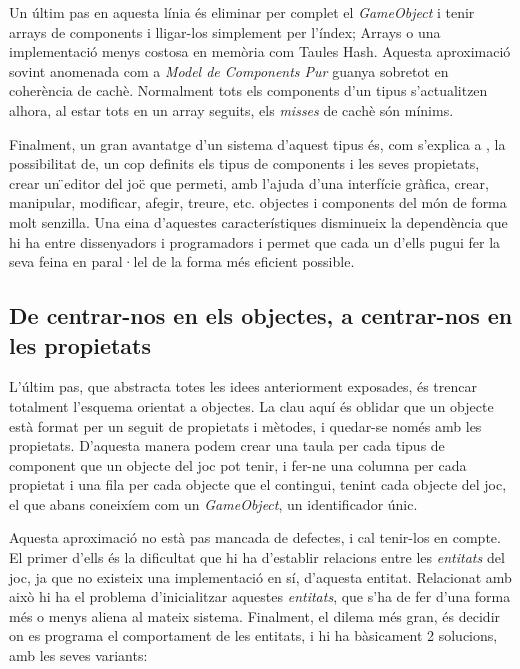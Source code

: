 Un últim pas en aquesta línia és eliminar per complet el {\em GameObject} i tenir arrays de components i lligar-los simplement per l'índex; Arrays o una implementació menys costosa en memòria com Taules Hash. Aquesta aproximació sovint anomenada com a {\em Model de Components Pur} guanya sobretot en coherència de cachè. Normalment tots els components d'un tipus s'actualitzen alhora, al estar tots en un array seguits, els {\em misses} de cachè són mínims.

Finalment, un gran avantatge d'un sistema d'aquest tipus és, com s'explica a \citep{Leonard99}, la possibilitat de, un cop definits els tipus de components i les seves propietats, crear un \"{}editor del joc\"{} que permeti, amb l'ajuda d'una interfície gràfica, crear, manipular, modificar, afegir, treure, etc. objectes i components del món de forma molt senzilla. Una eina d'aquestes característiques disminueix la dependència que hi ha entre dissenyadors i programadors i permet que cada un d'ells pugui fer la seva feina en paral·lel de la forma més eficient possible.

\subsection{De centrar-nos en els objectes, a centrar-nos en les propietats}

L'últim pas, que abstracta totes les idees anteriorment exposades, és trencar totalment l'esquema orientat a objectes. La clau aquí és oblidar que un objecte està format per un seguit de propietats i mètodes, i quedar-se només amb les propietats. D'aquesta manera podem crear una taula per cada tipus de component que un objecte del joc pot tenir, i fer-ne una columna per cada propietat i una fila per cada objecte que el contingui, tenint cada objecte del joc, el que abans coneixíem com un {\em GameObject}, un identificador únic.

Aquesta aproximació no està pas mancada de defectes, i cal tenir-los en compte. El primer d'ells és la dificultat que hi ha d'establir relacions entre les {\em entitats} del joc, ja que no existeix una implementació en sí, d'aquesta entitat. Relacionat amb això hi ha el problema d'inicialitzar aquestes {\em entitats}, que s'ha de fer d'una forma més o menys aliena al mateix sistema. Finalment, el dilema més gran, és decidir on es programa el comportament de les entitats, i hi ha bàsicament 2 solucions, amb les seves variants:

